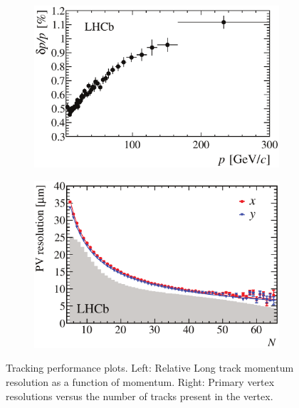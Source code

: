 \begin{figure}[t]
  \centering
  \begin{subfigure}{0.5\textwidth}
    \raggedright
    \includegraphics[width=\textwidth]{Figures/Chapter2/dppVsp-crop-cmyk}
    \caption{}
    \label{det_deltappvp}
  \end{subfigure}%
  \hfill%
  \begin{subfigure}{0.5\textwidth}
    \raggedleft
    \includegraphics[width=\textwidth]{Figures/Chapter2/DataResXY_1PV_2012-crop-cmyk.pdf}
    \caption{}
    \label{det_velo_pv_res}
  \end{subfigure}
  \caption{Tracking performance plots. Left: Relative Long track momentum resolution as a function of momentum.
          Right: Primary vertex resolutions versus the number of tracks present in the vertex.}
  \label{det_velo_perf}
\end{figure}

